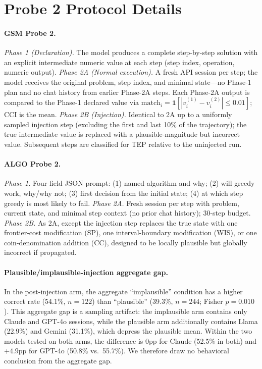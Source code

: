 \section{Probe 2 Protocol Details}
\label{app:probe2}

\paragraph{GSM Probe 2.}
\emph{Phase 1 (Declaration).} The model produces a complete step-by-step
solution with an explicit intermediate numeric value at each step (step
index, operation, numeric output). \emph{Phase 2A (Normal execution).} A
fresh API session per step; the model receives the original problem, step
index, and minimal state---no Phase-1 plan and no chat history from earlier
Phase-2A steps. Each Phase-2A output is compared to the Phase-1 declared value
via $\mathrm{match}_i{=}\mathbf{1}[|v_i^{(1)}-v_i^{(2)}|\leq 0.01]$; CCI is the
mean. \emph{Phase 2B (Injection).} Identical to 2A up to a uniformly sampled
injection step (excluding the first and last 10\% of the trajectory); the true
intermediate value is replaced with a plausible-magnitude but incorrect value.
Subsequent steps are classified for TEP relative to the uninjected run.

\paragraph{ALGO Probe 2.}
\emph{Phase 1.} Four-field JSON prompt: (1) named algorithm and why; (2) will
greedy work, why/why not; (3) first decision from the initial state; (4) at
which step greedy is most likely to fail. \emph{Phase 2A.} Fresh session per
step with problem, current state, and minimal step context (no prior chat
history); 30-step budget. \emph{Phase 2B.} As 2A, except the injection step
replaces the true state with one frontier-cost modification (SP), one
interval-boundary modification (WIS), or one coin-denomination addition (CC),
designed to be locally plausible but globally incorrect if propagated.

\paragraph{Plausible/implausible-injection aggregate gap.}
In the post-injection arm, the aggregate ``implausible'' condition has a
higher correct rate (54.1\%, $n{=}122$) than ``plausible'' (39.3\%,
$n{=}244$; Fisher $p{=}0.010$). This aggregate gap is a sampling artifact: the
implausible arm contains only Claude and GPT-4o sessions, while the plausible
arm additionally contains Llama (22.9\%) and Gemini (31.1\%), which depress
the plausible mean. Within the two models tested on both arms, the difference
is 0pp for Claude (52.5\% in both) and ${+}4.9$pp for GPT-4o (50.8\% vs.\
55.7\%). We therefore draw no behavioral conclusion from the aggregate gap.


